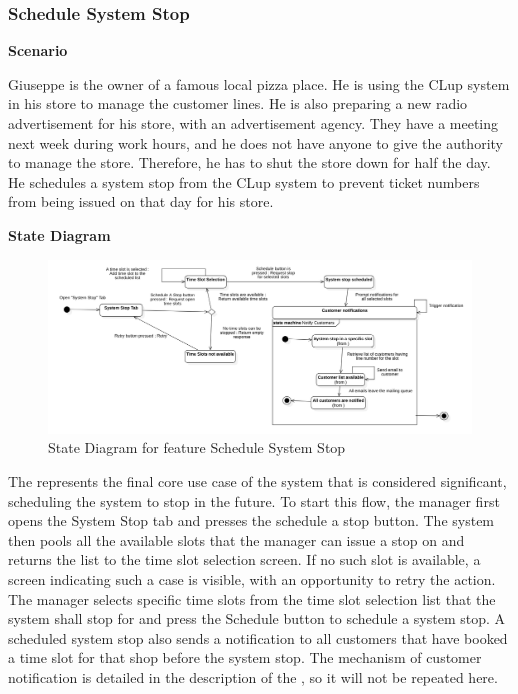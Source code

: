 \subsubsection{Schedule System Stop}

\textbf{Scenario}

Giuseppe is the owner of a famous local pizza place.
He is using the CLup system in his store to manage the customer lines.
He is also preparing a new radio advertisement for his store, with an advertisement agency.
They have a meeting next week during work hours, and he does not have anyone to give the authority to manage the store.
Therefore, he has to shut the store down for half the day.
He schedules a system stop from the CLup system to prevent ticket numbers from being issued on that day for his store.

\textbf{State Diagram}

\begin{figure}[H]
    \centering
    \includegraphics[height=0.4\textwidth]{Images/StateCharts/ScheduleSystemStop.png}
    \caption{State Diagram for feature Schedule System Stop}
    \label{fig:SDScheduleStop}
\end{figure}

The  represents the final core use case of the system that is considered significant, scheduling the system to stop in the future.
To start this flow, the manager first opens the System Stop tab and presses the schedule a stop button.
The system then pools all the available slots that the manager can issue a stop on and returns the list to the time slot selection screen.
If no such slot is available, a screen indicating such a case is visible, with an opportunity to retry the action.
The manager selects specific time slots from the time slot selection list that the system shall stop for and press the Schedule button to schedule a system stop.
A scheduled system stop also sends a notification to all customers that have booked a time slot for that shop before the system stop.
The mechanism of customer notification is detailed in the description of the , so it will not be repeated here.


